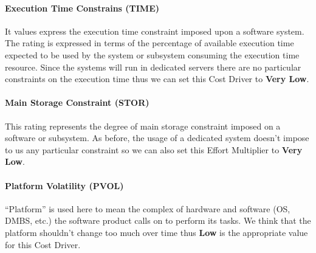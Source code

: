 
\paragraph{Execution Time Constrains (TIME)} It values express the execution time constraint imposed upon a software system. The rating is expressed in terms of the percentage of available execution time expected to be used by the system or subsystem consuming the execution time resource. Since the systems will run in dedicated servers there are no particular constraints on the execution time thus we can set this Cost Driver to \textbf{Very Low}.


\paragraph{Main Storage Constraint (STOR)} This rating represents the degree of main storage constraint imposed on a software or subsystem. As before, the usage of a dedicated system doesn't impose to us any particular constraint so we can also set this Effort Multiplier to \textbf{Very Low}.


\paragraph{Platform Volatility (PVOL)} ``Platform'' is used here to mean the complex of hardware and software (OS, DMBS, etc.) the software product calls on to perform its tasks. We think that the platform shouldn't change too much over time thus \textbf{Low} is the appropriate value for this Cost Driver. 


